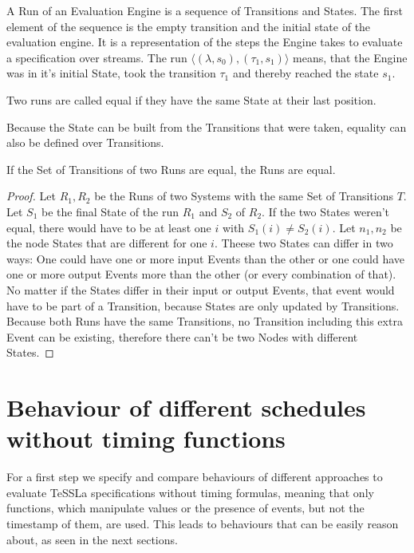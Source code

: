 A Run of an Evaluation Engine is a sequence of Transitions and States.
The first element of the sequence is the empty transition and the initial state of the evaluation engine.
It is a representation of the steps the Engine takes to evaluate a specification over streams.
The run \(\langle (\lambda, s_0), (\tau_1, s_1) \rangle\) means, that the Engine was in it's initial State, took the transition \(\tau_1\) and thereby reached the state \(s_1\).

\begin{definition}
  Two runs are called equal if they have the same State at their last position.
\label{def:equal_runs}
\end{definition}

Because the State can be built from the Transitions that were taken, equality can also be defined over Transitions.

\begin{lemma}
If the Set of Transitions of two Runs are equal, the Runs are equal.
\label{lemma:equal_runs_with_transitions}
\end{lemma}
\begin{proof}
  Let \(R_1, R_2\) be the Runs of two Systems with the same Set of Transitions \(T\).
  Let \(S_1\) be the final State of the run \(R_1\) and \(S_2\) of \(R_2\).
  If the two States weren't equal, there would have to be at least one \(i\) with \(S_1(i) \neq S_2(i)\).
  Let \(n_1, n_2\) be the node States that are different for one \(i\).
  Theese two States can differ in two ways: One could have one or more input Events than the other or one could have one or more output Events more than the other (or every combination of that).
  No matter if the States differ in their input or output Events, that event would have to be part of a Transition, because States are only updated by Transitions.
  Because both Runs have the same Transitions, no Transition including this extra Event can be existing, therefore there can't be two Nodes with different States.
\end{proof}

\section{Behaviour of different schedules without timing functions}
\label{sec:concepts:behaviour_without_timing}

For a first step we specify and compare behaviours of different approaches to evaluate TeSSLa specifications without timing formulas,
meaning that only functions, which manipulate values or the presence of events, but not the timestamp of them, are used.
This leads to behaviours that can be easily reason about, as seen in the next sections.

